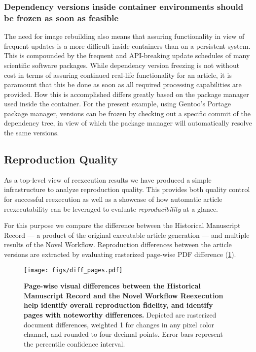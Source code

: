 \subsubsection{Dependency versions inside container environments should be frozen as soon as feasible}
The need for image rebuilding also means that assuring functionality in view of frequent updates is a more difficult inside containers than on a persistent system.
This is compounded by the frequent and API-breaking update schedules of many scientific software packages.
While dependency version freezing is not without cost in terms of assuring continued real-life functionality for an article, it is paramount that this be done as soon as all required processing capabilities are provided.
How this is accomplished differs greatly based on the package manager used inside the container.
For the present example, using Gentoo's Portage package manager, versions can be frozen by checking out a specific commit of the dependency tree, in view of which the package manager will automatically resolve the same versions.


\subsection{Reproduction Quality}


As a top-level view of reexecution results we have produced a simple infrastructure to analyze reproduction quality.
This provides both quality control for successful reexecution as well as a showcase of how automatic article reexecutability can be leveraged to evaluate \textit{reproducibility} at a glance.

For this purpose we compare the difference between the Historical Manuscript Record — a product of the original executable article generation — and multiple results of the Novel Workflow.
Reproduction differences between the article versions are extracted by evaluating rasterized page-wise PDF difference (\ref{fig:diff_pages}).

\begin{figure}
	\centering
	\texttt{[image: figs/diff\_pages.pdf]}
	\caption{
		\textbf{Page-wise visual differences between the Historical Manuscript Record and the Novel Workflow Reexecution help identify overall reproduction fidelity, and identify pages with noteworthy differences.}
		Depicted are rasterized document differences, weighted 1 for changes in any pixel color channel, and rounded to four decimal points.
		Error bars represent the  percentile confidence interval.
	}
	\label{fig:diff_pages}
\end{figure}

